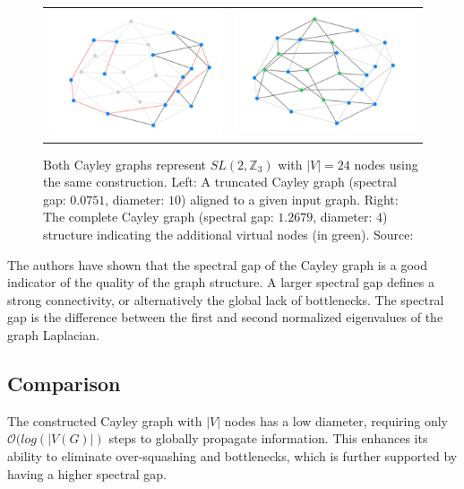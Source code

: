 \documentclass{article}
\theoremstyle{plain}
\theoremstyle{definition}
\theoremstyle{remark}
\begin{document}
\begin{figure}[htb!]
    \begin{center}
        \begin{tabular}{cc}
            \includegraphics[width=0.4\columnwidth]{figures/Cayley1.png}&
            \includegraphics[width=0.4\columnwidth]{figures/Cayley2.png}
        \end{tabular}
    \vskip -0.2in
    \caption{Both Cayley graphs represent $SL(2,\mathbb{Z}_3)$ with $|V|= 24$ nodes using the same construction.
    Left: A truncated Cayley graph (spectral gap: $0.0751$, diameter: $10$) aligned to a given input graph.
    Right: The complete Cayley graph (spectral gap: $1.2679$, diameter: $4$) structure indicating the
    additional virtual nodes (in green). Source: \cite{wilson2024cayleygraphpropagation}}
    \label{fig:cayley_graph}
    \end{center}
\end{figure}

The authors have shown that the spectral gap of the Cayley graph is a good indicator
of the quality of the graph structure. A larger spectral
gap defines a strong connectivity, or alternatively the global lack of bottlenecks.
The spectral gap is the difference between the first and second normalized eigenvalues of the graph Laplacian.

\subsection{Comparison}


The constructed Cayley graph with $|V|$ nodes has a low diameter, requiring only
$\mathcal{O}(log(|V(G)|)$ steps to globally propagate information. This enhances
its ability to eliminate over-squashing and bottlenecks, which is further 
supported by having a higher spectral gap.
\end{document}
